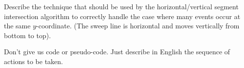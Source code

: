 Describe the technique that should be used by the horizontal/vertical
segment intersection algorithm to correctly handle the case where many
events occur at the same $y$-coordinate. (The sweep line is horizontal
and moves vertically from bottom to top).

Don't give us code or pseudo-code. Just describe in English the
sequence of actions to be taken.
